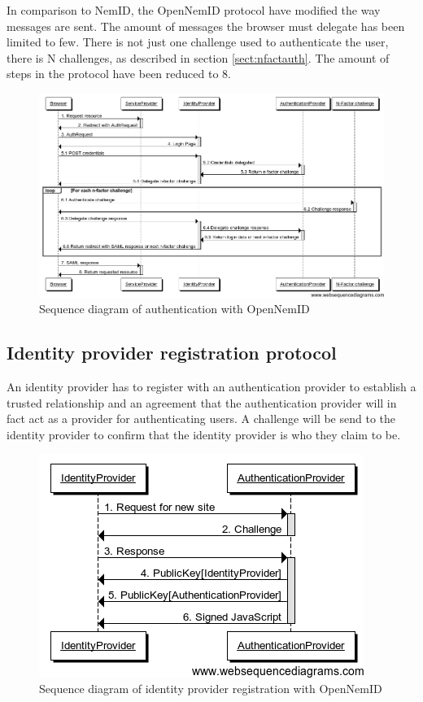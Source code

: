 \documentclass[twosided]{report}
\begin{document}
In comparison to NemID, the OpenNemID protocol have modified the way messages are sent. The amount of messages the browser must delegate has been limited to few. There is not just one challenge used to authenticate the user, there is N challenges, as described in section \ref{sect:nfactauth}. The amount of steps in the protocol have been reduced to 8.

\begin{figure}[H]
	\centering
	\includegraphics[scale=0.4]{images/Open-NemId-(User-Login).png}
	\caption{Sequence diagram of authentication with OpenNemID}
\end{figure}

\subsection{Identity provider registration protocol}
An identity provider has to register with an authentication provider to establish a trusted relationship and an agreement that the authentication provider will in fact act as a provider for authenticating users. A challenge will be send to the identity provider to confirm that the identity provider is who they claim to be.

\begin{figure}[H]
	\centering
	\includegraphics[scale=0.6]{images/Open-NemId-(IdentityProvider-Registration).png}
	\caption{Sequence diagram of identity provider registration with OpenNemID}
\end{figure}
\end{document}
